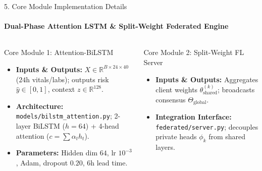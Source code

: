 \documentclass[aspectratio=169, 11pt]{beamer}
\begin{document}
\begin{frame}{5. Core Module Implementation Details}
    \framesubtitle{Dual-Phase Attention LSTM \& Split-Weight Federated Engine}
    \begin{columns}[T]
        \begin{block}{\footnotesize Core Module 1: Attention-BiLSTM}
            \scriptsize
            \begin{itemize}
                \item \textbf{Inputs \& Outputs:} $X \in \mathbb{R}^{B \times 24 \times 40}$ ($24$h vitals/labs); outputs risk $\hat{y} \in [0, 1]$, context $z \in \mathbb{R}^{128}$.
                \item \textbf{Architecture:} \texttt{models/bilstm\_attention.py}; 2-layer BiLSTM ($h=64$) + 4-head attention ($c = \sum \alpha_t h_t$).
                \item \textbf{Parameters:} Hidden dim $64$, lr $10^{-3}$, Adam, dropout $0.20$, 6h lead time.
            \end{itemize}
        \end{block}
        \vspace{-0.15cm}

        \begin{block}{\footnotesize Core Module 2: Split-Weight FL Server}
            \scriptsize
            \begin{itemize}
                \item \textbf{Inputs \& Outputs:} Aggregates client weights $\theta_{\text{shared}}^{(k)}$; broadcasts consensus $\Theta_{\text{global}}$.
                \item \textbf{Integration Interface:} \texttt{federated/server.py}; decouples private heads $\phi_k$ from shared layers.
            \end{itemize}
        \end{block}


\end{columns}
\end{frame}
\end{document}
